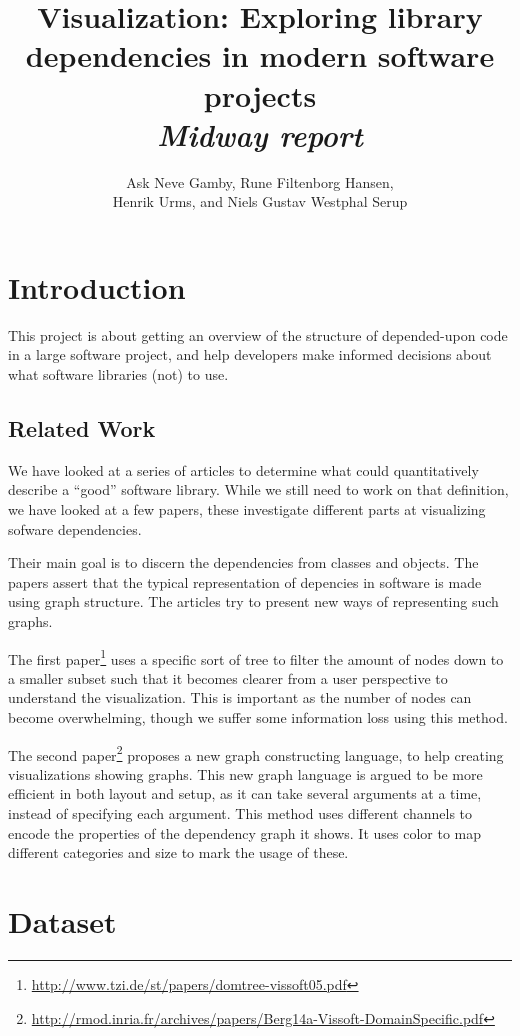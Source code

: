 \documentclass[a4paper,12pt]{article}
\title{\textbf{Visualization}: Exploring library dependencies in modern software projects\\\emph{Midway report}}
\author{Ask Neve Gamby, Rune Filtenborg Hansen,\\
Henrik Urms, and Niels Gustav Westphal Serup}
\begin{document}
\maketitle

\section{Introduction}

This project is about getting an overview of the structure of depended-upon code
in a large software project, and help developers make informed decisions about
what software libraries (not) to use.


\subsection{Related Work}

We have looked at a series of articles to determine what could quantitatively
describe a ``good'' software library.  While we still need to work on that
definition, we have looked at a few papers, these investigate different parts at
visualizing sofware dependencies.

Their main goal is to discern the dependencies from classes and objects. The
papers assert that the typical representation of depencies in software is made
using graph structure.  The articles try to present new ways of representing
such graphs.

The first
paper\footnote{\url{http://www.tzi.de/st/papers/domtree-vissoft05.pdf}} uses a
specific sort of tree to filter the amount of nodes down to a smaller subset
such that it becomes clearer from a user perspective to understand the
visualization. This is important as the number of nodes can become overwhelming,
though we suffer some information loss using this method.

The second
paper\footnote{\url{http://rmod.inria.fr/archives/papers/Berg14a-Vissoft-DomainSpecific.pdf}}
proposes a new graph constructing language, to help creating visualizations
showing graphs. This new graph language is argued to be more efficient in both
layout and setup, as it can take several arguments at a time, instead of
specifying each argument.  This method uses different channels to encode the
properties of the dependency graph it shows. It uses color to map different
categories and size to mark the usage of these.


\section{Dataset}
\end{document}
